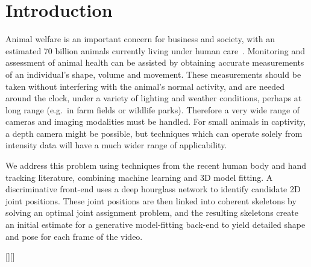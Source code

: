 \section{Introduction}

Animal welfare is an important concern for business and society, with an estimated 70 billion animals currently living under human care~\cite{FAOSTAT}. Monitoring and assessment of animal health can be assisted by obtaining accurate measurements of an individual's shape, volume and movement. These measurements should be taken without interfering with the animal's normal activity, and are needed around the clock, under a variety of lighting and weather conditions, perhaps at long range (e.g.\ in farm fields or wildlife parks). Therefore a very wide range of cameras and imaging modalities must be handled. For small animals in captivity, a depth camera might be possible, but techniques which can operate solely from intensity data will have a much wider range of applicability.

We address this problem using techniques from the recent human body and hand tracking literature, combining machine learning and 3D model fitting.  A discriminative front-end uses a deep hourglass network to identify candidate 2D joint positions. These joint positions are then linked into coherent skeletons by solving an optimal joint assignment problem, and the resulting skeletons create an initial estimate for a generative model-fitting back-end to yield detailed shape and pose for each frame of the video.  

[][\FBwidth]

\def\bb{\rule{2in}{0pt}\rule{0pt}{1in}}
\def\labelledpic#1#2{
\begin{tikzpicture}
\node (pic) {#1};
\path[fill=white,draw=gray,thick] (pic.south west) +(3ex,3ex) circle (2ex)
   node {#2};
\end{tikzpicture}
}


